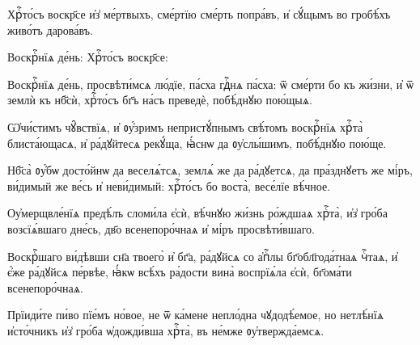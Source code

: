\label{pascha}


 Хрⷭ҇то́съ воскр҃се и҆з̾ ме́ртвыхъ, сме́ртїю  сме́рть попра́въ, и҆ сꙋ́щымъ во гробѣ́хъ живо́тъ дарова́въ. 
%

\hKv Воскрⷭ҇нїѧ де́нь:  Хрⷭ҇то́съ воскр҃се: 



\hKv Воскрⷭ҇нїѧ де́нь, просвѣти́мсѧ лю́дїе, па́сха  гдⷭ҇нѧ па́сха: ѿ сме́рти бо къ жи́зни, и҆ ѿ  землѝ къ нб҃сѝ, хрⷭ҇то́съ бг҃ъ  на́съ преведѐ, побѣ́днꙋю пою́щыѧ. 


\hKv Ѡ҆чи́стимъ чꙋ̑вствїѧ, и҆ ᲂу҆́зримъ непристꙋ́пнымъ свѣ́томъ  воскрⷭ҇нїѧ хрⷭ҇та̀ блиста́ющасѧ, и҆ ра́дꙋйтесѧ рекꙋ́ща,  ꙗ҆́снѡ да ᲂу҆слы́шимъ, побѣ́днꙋю пою́ще. 

\hKv Нб҃са̀ ᲂу҆́бѡ досто́йнѡ да веселѧ́тсѧ, землѧ́ же да  ра́дꙋетсѧ, да пра́зднꙋетъ же мі́ръ, ви́димый же ве́сь и҆  неви́димый: хрⷭ҇то́съ бо воста̀, весе́лїе вѣ́чное. 


\hKv Оу҆мерщвле́нїѧ предѣ́лъ сломи́ла є҆сѝ,  вѣ́чнꙋю жи́знь ро́ждшаѧ хрⷭ҇та̀, и҆з̾ гро́ба возсїѧ́вшаго  дне́сь, дв҃о всенепоро́чнаѧ и҆ мі́ръ просвѣти́вшаго.  

\hKv Воскрⷭ҇шаго ви́дѣвши сн҃а твоего̀ и҆ бг҃а,  ра́дꙋйсѧ со а҆пⷭ҇лы бг҃обл҃года́тнаѧ чⷭ҇таѧ, и҆ є҆́же  ра́дꙋйсѧ пе́рвѣе, ꙗ҆́кѡ всѣ́хъ ра́дости вина̀ воспрїѧ́ла  є҆сѝ, бг҃ома́ти всенепоро́чнаѧ. 
%
%

\hKv Прїиди́те пи́во пїе́мъ но́вое, не ѿ ка́мене  непло́дна чꙋдодѣ́емое, но нетлѣ́нїѧ и҆сто́чникъ и҆з̾  гро́ба ѡ҆дожди́вша хрⷭ҇та̀, въ не́мже ᲂу҆твержда́емсѧ. 

